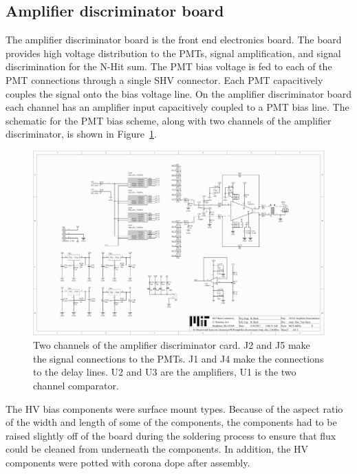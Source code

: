 \documentclass[review,number,sort&compress]{elsarticle}
\begin{document}
\subsection{Amplifier discriminator board}
\label{sec:Amp-Disc}
%
The amplifier discriminator board is the front end electronics board.
The board provides high voltage distribution to the PMTs, signal
amplification, and signal discrimination for the N-Hit sum. The PMT
bias voltage is fed to each of the PMT connections through a single
SHV connector. Each PMT capacitively couples the signal onto the bias
voltage line. On the amplifier discriminator board each channel has
an amplifier input capacitively coupled to a PMT bias line. The schematic for the
PMT bias scheme, along with two channels of the amplifier discriminator, is shown in Figure~\ref{fig:ampdiscsch}.

\begin{figure}[ht]
\begin{center}
\includegraphics[width=5.5in, keepaspectratio=true, page=2, trim=4.54in 2.12in 4.54in 2.12in, clip=true]{graphics/veto_sch.pdf}
\caption{Two channels of the amplifier discriminator card. J2 and J5 make the signal connections to the PMTs. J1 and J4 make the connections to the delay lines. U2 and U3 are the amplifiers, U1 is the two channel comparator.
\label{fig:ampdiscsch}}
\end{center}
\end{figure}

The HV bias components were surface mount types. Because of the
aspect ratio of the width and length of some of the components, the
components had to be raised slightly off of the board during the
soldering process to ensure that flux could be cleaned from underneath
the components. In addition, the HV components were potted with
corona dope after assembly.
\end{document}
